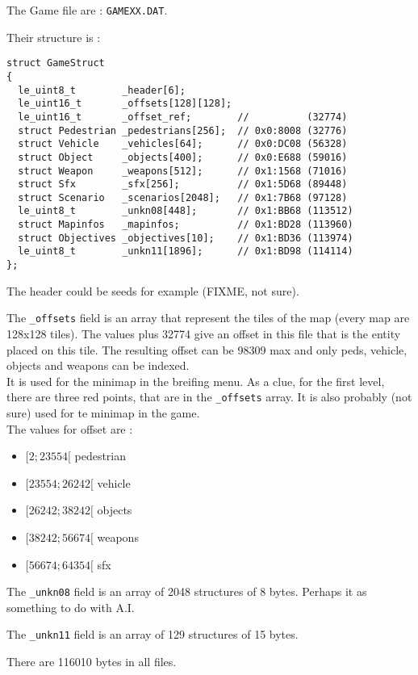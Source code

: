 \documentclass[a4paper,twoside,12pt,dvips]{article}
\begin{document}
The Game file are : \texttt{GAMEXX.DAT}.

Their structure is :

\begin{lstlisting}
struct GameStruct
{
  le_uint8_t        _header[6];
  le_uint16_t       _offsets[128][128];
  le_uint16_t       _offset_ref;        //          (32774)
  struct Pedestrian _pedestrians[256];  // 0x0:8008 (32776)
  struct Vehicle    _vehicles[64];      // 0x0:DC08 (56328)
  struct Object     _objects[400];      // 0x0:E688 (59016)
  struct Weapon     _weapons[512];      // 0x1:1568 (71016)
  struct Sfx        _sfx[256];          // 0x1:5D68 (89448)
  struct Scenario   _scenarios[2048];   // 0x1:7B68 (97128)
  le_uint8_t        _unkn08[448];       // 0x1:BB68 (113512)
  struct Mapinfos   _mapinfos;          // 0x1:BD28 (113960)
  struct Objectives _objectives[10];    // 0x1:BD36 (113974)
  le_uint8_t        _unkn11[1896];      // 0x1:BD98 (114114)
};
\end{lstlisting}

The header could be seeds for example (FIXME, not sure).

The \texttt{\_offsets} field is an array that represent the tiles of the map (every map are 128x128 tiles). The values plus 32774 give an offset in this file that is the entity placed on this tile. The resulting offset can be 98309 max and only peds, vehicle, objects and weapons can be indexed. \\
It is used for the minimap in the breifing menu. As a clue, for the first level, there are three red points, that are in the \texttt{\_offsets} array. It is also probably (not sure) used for te minimap in the game. \\
The values for offset are :
\begin{itemize}
\item     $[2;23554[$ pedestrian
\item $[23554;26242[$ vehicle
\item $[26242;38242[$ objects
\item $[38242;56674[$ weapons
\item $[56674;64354[$ sfx
\end{itemize}

The \texttt{\_unkn08} field is an array of 2048 structures of 8 bytes. Perhaps it as something to do with A.I.

The \texttt{\_unkn11} field is an array of 129 structures of 15 bytes.

There are 116010 bytes in all files.
\end{document}
